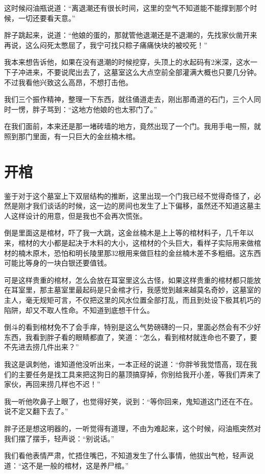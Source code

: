 这时候闷油瓶说道：“离退潮还有很长时间，这里的空气不知道能不能撑到那个时候，一切还要看天意。”

胖子跳起来，说道：“他娘的蛋的，那就管他退潮还是不退潮的，先找家伙凿开来再说，这么闷死太憋屈了，我宁可找只粽子痛痛快块的被咬死！”

我本来想告诉他，如果在没有退潮的时候挖穿，头顶上的水起码有2米深，这水一下子冲进来，不要说爬出去了，这墓室这么大点空前全部灌满大概也只要几分钟。不过我看他兴致这么高昂，不想打击他。

我们三个振作精神，整理一下东西，就往俑道走去，刚出那甬道的石门，三个人同时一愣，胖子骂到：“这地方他娘的也太邪门了。”

在我们面前，本来还是那一堵砖墙的地方，竟然出现了一个门。我用手电一照，就照到那门里面，有一只巨大的金丝楠木棺。

\chapter{开棺}

鉴于对于这个墓室上下双层结构的推断，这里出现一个门我已经不觉得奇怪了，必然是刚才我们谈话的时候，这一边的房间也发生了上下偏移，虽然还不知道这墓主人这样设计的用意，但是我也不会再次慌张。

倒是里面这是棺材，吓了我一大跳，这金丝楠木是上上等的棺材料子，几千年以来，棺材的大小都是起决于木料的大小，这棺材的个头巨大，看样子实际用来做棺材的楠木原木，恐怕和明长陵里那32根用来做巨柱的金丝楠木差不多粗细。这东西可能比等身的一块白银还要值钱。

可是这样贵重的棺材，怎么会放在耳室里这么古怪，如果这样贵重的棺材都只能放在耳室里，那主墓室里最起码是只金棺才行，我感觉到越来越莫名奇妙，这墓室的主人，毫无规矩可言，不仅把这里的风水位置全部打乱，而且到处设下极其机巧的陷阱，却又不取人性命。不知道到底想干什么。

倒斗的看到棺材免不了会手痒，特别是这么气势磅礴的一只，里面必然会有不少好东西，我看到胖子看的眼睛都直了，笑道：“怎么，看到棺材就连命也不要了，要不先进去捞几件出来？”

我这是讽刺他，谁知道他没听出来，一本正经的说道：“你胖爷我觉悟高，现在我们的主要任务是找工具来把这狗日的墓顶搞穿掉，你别给我开小差，等我们弄来了家伙，再回来捞几样也不迟！”

我一听他吹鼻子上眼了，也觉得好笑，说到：“等你回来，鬼知道这门还在不在。说不定又翻下去了。”

胖子还是想这明器的，一听觉得有道理，不由为难起来，这个时候，闷油瓶突然对我们摆了摆手，轻声说：“别说话。”

我们看他表情严肃，忙捂住嘴巴，不知道发生了什么事情，他拔出气枪，轻声说道：“这不是一般的棺材，这是养尸棺。”

